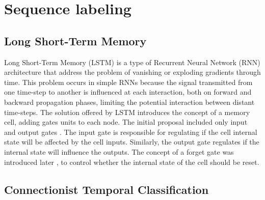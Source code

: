 \section{\label{sec:sequencelabeling}Sequence labeling}






\subsection{\label{sec:lstm}Long Short-Term Memory}
Long Short-Term Memory\cite{hochreiter_long_1997} (LSTM) is a type of Recurrent Neural Network (RNN) architecture that address the problem of vanishing or exploding gradients through time. This problem occurs in simple RNNs because the signal transmitted from one time-step to another is influenced at each interaction, both on forward and backward propagation phases, limiting the potential interaction between distant time-steps. The solution offered by LSTM introduces the concept of a memory cell, adding gates units to each node. The initial proposal included only input and output gates \cite{hochreiter_long_1997}. The input gate is responsible for regulating if the cell internal state will be affected by the cell inputs. Similarly, the output gate regulates if the internal state will influence the outputs. The concept of a forget gate was introduced later \cite{gers_learning_1999}, to control whether the internal state of the cell should be reset.



\subsection{\label{sec:ctc}Connectionist Temporal Classification}


